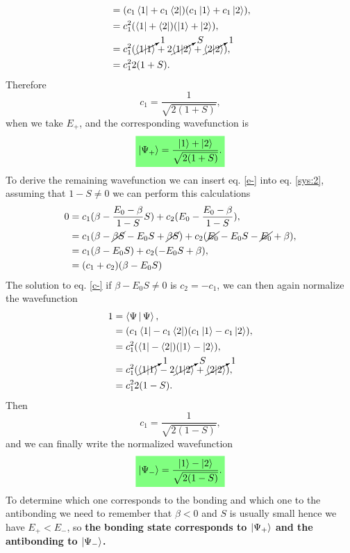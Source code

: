 \begin{questions}
\begin{solution}
\begin{equation}
\begin{aligned}[b]
      &= (c_1\bra{1} + c_1\bra{2})(c_1\ket{1}+ c_1\ket{2}),\\
      &= c_1^2 (\bra{1} + \bra{2})(\ket{1}+ \ket{2}),\\
      &= c_1^2( \cancelto{1}{\braket{1|1}} +2\cancelto{S}{\braket{1|2}} + \cancelto{1}{\braket{2|2}}),\\
      &= c_1^22(1+S).
  \end{aligned}
\end{equation}
Therefore
\begin{equation}
  c_1 = \frac{1}{\sqrt{2(1+S)}},
\end{equation}
when we take $E_+$, and the corresponding wavefunction is
\begin{equation}
  \hlgreen{\ket{\Psi_+} = \frac{\ket{1} + \ket{2}}{\sqrt{2(1+S)}}.}
\end{equation}
To derive the remaining wavefunction we can insert eq. \ref{e-} into eq. \ref{sys:2}, assuming that $1-S \neq 0$ we can perform this calculations
\begin{equation}
  \begin{aligned}[b]
    0 &= c_1(\beta - \frac{E_0-\beta}{1-S}S) + c_2(E_0 - \frac{E_0-\beta}{1-S}),\\
    &= c_1(\beta - \cancel{\beta S} - E_0S+\cancel{\beta S}) + c_2(\cancel{E_0} - E_0S - \cancel{E_0}+\beta),\\
    &= c_1(\beta - E_0S) + c_2( - E_0S+\beta),\\
    &= (c_1 + c_2)(\beta - E_0S)\label{c-}
  \end{aligned}
\end{equation}
The solution to eq. \ref{c-} if $\beta -E_0S \neq 0$ is $c_2 = -c_1$, we can then again normalize the wavefunction
\begin{equation}
  \begin{aligned}[b]
    1 &= \Braket{\Psi|\Psi},\\
      &= (c_1\bra{1} - c_1\bra{2})(c_1\ket{1}- c_1\ket{2}),\\
      &= c_1^2 (\bra{1} - \bra{2})(\ket{1}- \ket{2}),\\
      &= c_1^2( \cancelto{1}{\braket{1|1}} -2\cancelto{S}{\braket{1|2}} + \cancelto{1}{\braket{2|2}}),\\
      &= c_1^22(1-S).
  \end{aligned}
\end{equation}
Then
\begin{equation}
  c_1 = \frac{1}{\sqrt{2(1-S)}},
\end{equation}
and we can finally write the normalized wavefunction
\begin{equation}
  \hlgreen{\ket{\Psi_-} = \frac{\ket{1} - \ket{2}}{\sqrt{2(1-S)}}.}
\end{equation}
To determine which one corresponds to the bonding and which one to the antibonding we need to remember that $\beta<0$ and $S$ is usually small hence we have $E_+<E_-$, so \textbf{the bonding state corresponds to $\ket{\Psi_+}$ and the antibonding to $\ket{\Psi_-}$.}


\end{solution}
\end{questions}
